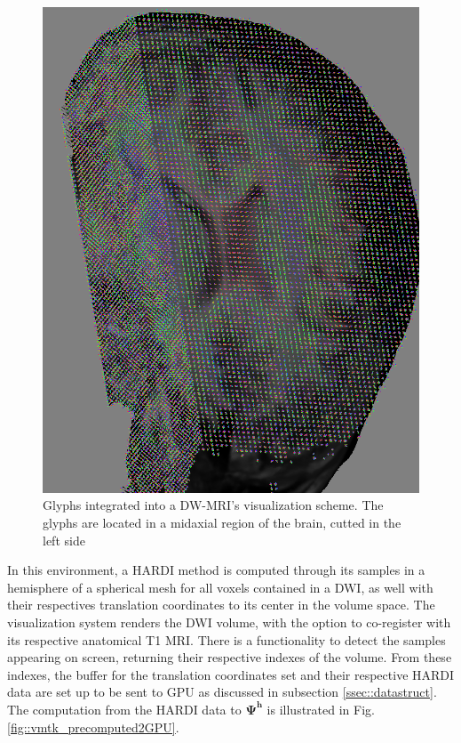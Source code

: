 \documentclass[twoside,twocolumn,10pt]{article}
\begin{document}
\begin{figure}[h]
    \centering
    \includegraphics[width=1.00\linewidth, angle=0]{figs/Results/glyphs_integrated_DWI.png}
    \caption{Glyphs integrated into a DW-MRI's visualization scheme. The glyphs are located in a midaxial region of the brain, cutted in the left side %
    }
    \label{fig::ex_glyph_DWI_visualization}
\end{figure}

In this environment, a HARDI method is computed through its samples in a hemisphere of a spherical mesh for all voxels contained in a DWI, as well with their respectives translation coordinates to its center in the volume space. The visualization system renders the DWI volume, with the option to co-register with its respective anatomical T1 MRI. There is a functionality to detect the samples appearing on screen, returning their respective indexes of the volume. From these indexes, the buffer for the translation coordinates set and their respective HARDI data are set up to be sent to GPU as discussed in subsection \ref{ssec::datastruct}. The computation from the HARDI data to $\bm{\Psi^h}$ is illustrated in Fig. \ref{fig::vmtk_precomputed2GPU}.
\end{document}
